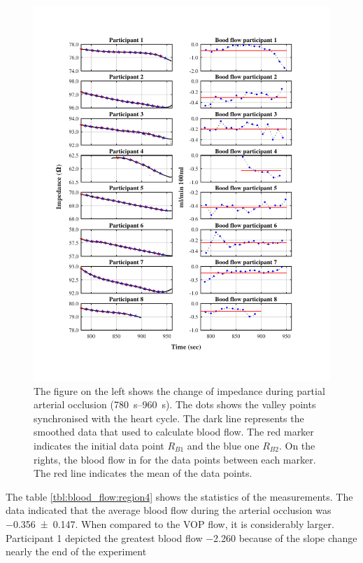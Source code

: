 \begin{figure}[!htpb]
	\includegraphics[width=\textwidth,height=\textheight,keepaspectratio,trim={0.5cm 0cm 0cm 1cm},clip]{figure_vop_11}    
	\caption[Blood flow calculated from partial arterial occlusion for every 10 beats]{The figure on the left shows the change of impedance during partial arterial occlusion (\SIrange{780}{960}{\second}). The dots shows the valley points synchronised with the heart cycle. The dark line represents the smoothed data that used to calculate blood flow. The red marker indicates the initial data point $R_{B1}$ and the blue one $R_{B2}$. On the rights, the blood flow in \si{\bfv} for the data points between each marker. The red line indicates the mean of the data points.}
	\label{fig:blood_flow:arterial_occlusion}
\end{figure}

The table \ref{tbl:blood_flow:region4} shows the statistics of the measurements. The data indicated that the average blood flow during the arterial occlusion was \SI{-0.356(0147)}{\bfv}. When compared to the VOP flow, it is considerably larger. Participant 1 depicted the greatest blood flow \SI{-2.260}{\bfv} because of the slope change nearly the end of the experiment

